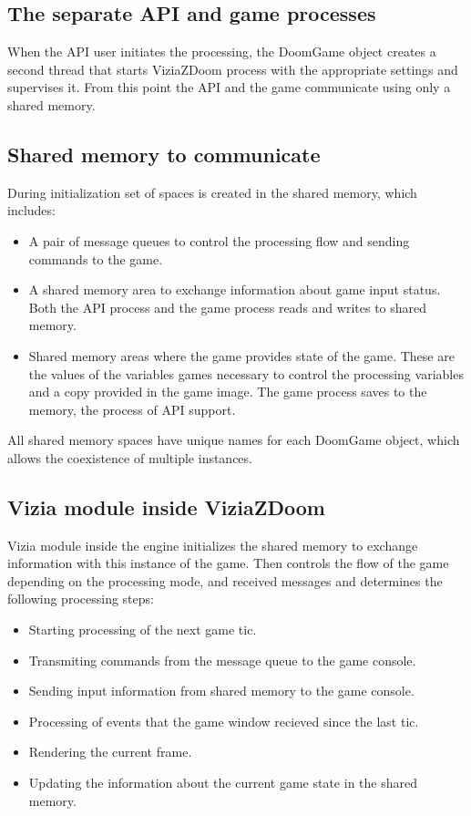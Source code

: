 \subsection{The separate API and game processes}\label{sec:architecture_separate_processes}

When the API user initiates the processing, the DoomGame object creates a second thread that starts ViziaZDoom process with the appropriate settings and supervises it. From this point the API and the game communicate using only a shared memory.


\subsection{Shared memory to communicate}\label{sec:architecture_shared_memory}

During initialization set of spaces is created in the shared memory, which includes:
    \begin{itemize}
    \item A pair of message queues to control the processing flow and sending commands to the game.
    \item A shared memory area to exchange information about game input status. Both the API process and the game process reads and writes to shared memory.
    \item Shared memory areas where the game provides state of the game. These are the values of the variables games necessary to control the processing variables and a copy provided  in the game image. The game process saves to the memory, the process of API support.
    \end{itemize}
All shared memory spaces have unique names for each DoomGame object, which allows the coexistence of multiple instances.


\subsection{Vizia module inside ViziaZDoom}\label{sec:architecture_inside_viziazdoom}

Vizia module inside the engine initializes the shared memory to exchange information with this instance of the game. Then controls the flow of the game depending on the processing mode, and received messages and determines the following processing steps:

    \begin{itemize}
    \item Starting processing of the next game tic.
    \item Transmiting commands from the message queue to the game console.
    \item Sending input information from shared memory to the game console.
    \item Processing of events that the game window recieved since the last tic.
    \item Rendering the current frame.
    \item Updating the information about the current game state in the shared memory.
    \end{itemize}

